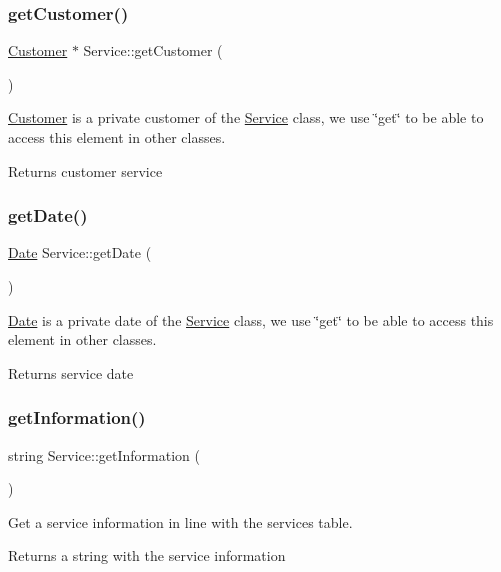 \subsubsection{\texorpdfstring{get\+Customer()}{getCustomer()}}
{\footnotesize\ttfamily \hyperlink{classCustomer}{Customer} $\ast$ Service\+::get\+Customer (\begin{DoxyParamCaption}{ }\end{DoxyParamCaption})}

\hyperlink{classCustomer}{Customer} is a private customer of the \hyperlink{classService}{Service} class, we use \char`\"{}get\char`\"{} to be able to access this element in other classes. \begin{DoxyReturn}{Returns}
customer service 
\end{DoxyReturn}
\hypertarget{classService_af0a4561b2506893b9026ca31afef179a}{}\label{classService_af0a4561b2506893b9026ca31afef179a} 
\subsubsection{\texorpdfstring{get\+Date()}{getDate()}}
{\footnotesize\ttfamily \hyperlink{classDate}{Date} Service\+::get\+Date (\begin{DoxyParamCaption}{ }\end{DoxyParamCaption})}

\hyperlink{classDate}{Date} is a private date of the \hyperlink{classService}{Service} class, we use \char`\"{}get\char`\"{} to be able to access this element in other classes. \begin{DoxyReturn}{Returns}
service date 
\end{DoxyReturn}
\hypertarget{classService_a8c484a24407d965fec9d9a292d58cefb}{}\label{classService_a8c484a24407d965fec9d9a292d58cefb} 
\subsubsection{\texorpdfstring{get\+Information()}{getInformation()}}
{\footnotesize\ttfamily string Service\+::get\+Information (\begin{DoxyParamCaption}{ }\end{DoxyParamCaption})}

Get a service information in line with the services table. \begin{DoxyReturn}{Returns}
a string with the service information 
\end{DoxyReturn}
\hypertarget{classService_a83ce29e76b859a6feb292f4f39661eaa}{}\label{classService_a83ce29e76b859a6feb292f4f39661eaa} 

